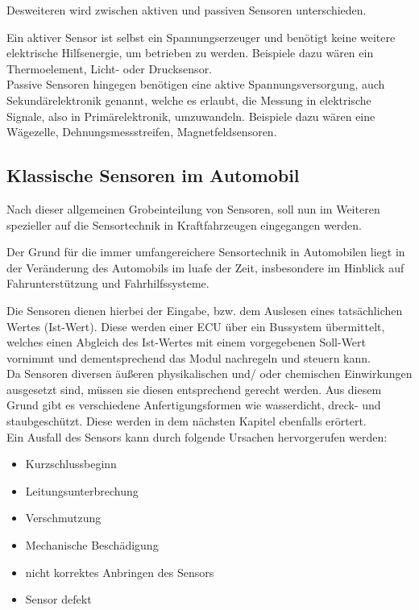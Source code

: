                 
                Desweiteren wird zwischen aktiven und passiven Sensoren unterschieden. 
                
                Ein aktiver Sensor ist selbst ein Spannungserzeuger und benötigt keine weitere elektrische Hilfsenergie, um betrieben zu werden. Beispiele dazu wären ein Thermoelement, Licht- oder Drucksensor.\\
                
                Passive Sensoren hingegen benötigen eine aktive Spannungsversorgung, auch Sekundärelektronik genannt, welche es erlaubt, die Messung in elektrische Signale, also in Primärelektronik, umzuwandeln. Beispiele dazu wären eine Wägezelle, Dehnungsmessstreifen, Magnetfeldsensoren.		
                            
                                        
\subsection{Klassische Sensoren im Automobil} 
        
    Nach dieser allgemeinen Grobeinteilung von Sensoren, soll nun im Weiteren spezieller auf die Sensortechnik in Kraftfahrzeugen eingegangen werden.

    Der Grund für die immer umfangereichere Sensortechnik in Automobilen liegt in der Veränderung des Automobils im luafe der Zeit, insbesondere im Hinblick auf Fahrunterstützung und Fahrhilfssysteme.
    
    Die Sensoren dienen hierbei der Eingabe,  bzw. dem Auslesen eines tatsächlichen Wertes (Ist-Wert). Diese werden einer ECU über ein Bussystem übermittelt, welches einen Abgleich des Ist-Wertes mit einem vorgegebenen Soll-Wert vornimmt und dementsprechend das Modul nachregeln und steuern kann. \\ 
    
    Da Sensoren diversen äußeren physikalischen und/ oder chemischen Einwirkungen ausgesetzt sind, müssen sie diesen entsprechend gerecht werden. Aus diesem Grund gibt es verschiedene Anfertigungsformen wie wasserdicht, dreck- und staubgeschützt. Diese werden in dem nächsten Kapitel ebenfalls erörtert.\\  
            
        Ein Ausfall des Sensors kann durch folgende Ursachen hervorgerufen werden:

        \begin{itemize}
            \item Kurzschlussbeginn
            \item Leitungsunterbrechung
            \item Verschmutzung
            \item Mechanische Beschädigung
            \item nicht korrektes Anbringen des Sensors
            \item Sensor defekt
        \end{itemize}	
        

